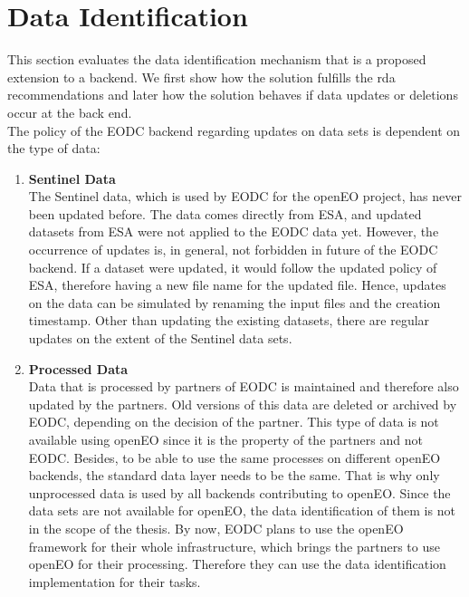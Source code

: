 \documentclass[draft,final]{vutinfth} %
\begin{document}

\section{Data Identification}\label{Evaluation:special_dataid}
This section evaluates the data identification mechanism that is a proposed extension to a backend. We first show how the solution fulfills the \acrshort{rda} recommendations and later how the solution behaves if data updates or deletions occur at the back end.\\  
The policy of the EODC backend regarding updates on data sets is dependent on the type of data:

\begin{enumerate}
	\item \textbf{Sentinel Data} \\
	The Sentinel data, which is used by EODC for the openEO project, has never been updated before. The data comes directly from ESA, and updated datasets from ESA were not applied to the EODC data yet. However, the occurrence of updates is, in general, not forbidden in future of the EODC backend. If a dataset were updated, it would follow the updated policy of ESA, therefore having a new file name for the updated file. Hence, updates on the data can be simulated by renaming the input files and the creation timestamp. Other than updating the existing datasets, there are regular updates on the extent of the Sentinel data sets.   
	\item \textbf{Processed Data} \\
	Data that is processed by partners of EODC is maintained and therefore also updated by the partners. Old versions of this data are deleted or archived by EODC, depending on the decision of the partner. This type of data is not available using openEO since it is the property of the partners and not EODC. Besides, to be able to use the same processes on different openEO backends, the standard data layer needs to be the same. That is why only unprocessed data is used by all backends contributing to openEO. Since the data sets are not available for openEO, the data identification of them is not in the scope of the thesis. By now, EODC plans to use the openEO framework for their whole infrastructure, which brings the partners to use openEO for their processing. Therefore they can use the data identification implementation for their tasks.
\end{enumerate}
\end{document}
